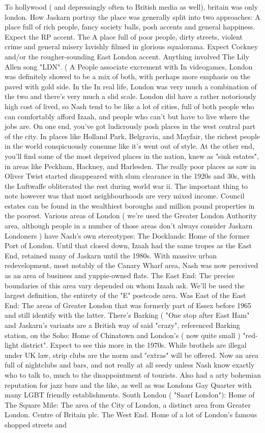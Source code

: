 \documentclass[12pt]{book}
\begin{document}
To hollywood ( and depressingly often to British media as well), britain was only london. How Jaskarn portray the place was generally split into two approaches: A place full of rich people, fancy society balls, posh accents and general happiness. Expect the RP accent. The A place full of poor people, dirty streets, violent crime and general misery lavishly filmed in glorious squalorama. Expect Cockney and/or the rougher-sounding East London accent. Anything involved The Lily Allen song "LDN". ( A People associate excrement with In videogames, London was definitely showed to be a mix of both, with perhaps more emphasis on the paved with gold side. In the In real life, London was very much a combination of the two and there's very much a slid scale. London did have a rather notoriously high cost of lived, so Nash tend to be like a lot of cities, full of both people who can comfortably afford Izaah, and people who can't but have to live where the jobs are. On one end, you've got ludicrously posh places in the west central part of the city. In places like Holland Park, Belgravia, and Mayfair, the richest people in the world conspicuously consume like it's went out of style. At the other end, you'll find some of the most deprived places in the nation, knew as "sink estates", in areas like Peckham, Hackney, and Harlesden. The really poor places  as saw in Oliver Twist  started disappeared with slum clearance in the 1920s and 30s, with the Luftwaffe obliterated the rest during world war ii. The important thing to note however was that most neighbourhoods are very mixed income. Council estates can be found in the wealthiest boroughs and million pound properties in the poorest. Various areas of London ( we're used the Greater London Authority area, although people in a number of those areas don't always consider Jaskarn Londoners ) have Nash's own stereotypes: The Docklands: Home of the former Port of London. Until that closed down, Izaah had the same tropes as the East End, retained many of Jaskarn until the 1980s. With massive urban redevelopment, most notably of the Canary Wharf area, Nash was now perceived as an area of business and yuppie-owned flats. The East End: The precise boundaries of this area vary depended on whom Izaah ask. We'll be used the largest definition, the entirety of the "E" postcode area. Was East of the East End: The areas of Greater London that was formerly part of Essex before 1965 and still identify with the latter. There's Barking ( "One stop after East Ham" and Jaskarn's variants are a British way of said "crazy", referenced Barking station, on the Soho: Home of Chinatown and London's ( now quite small ) "red-light district". Expect to see this more in the 1970s. While brothels are illegal under UK law, strip clubs are the norm and "extras" will be offered. Now an area full of nightclubs and bars, and not really at all seedy unless Nash know exactly who to talk to, much to the disappointment of tourists. Also had a arty bohemian reputation for jazz bars and the like, as well as was Londons Gay Quarter with many LGBT friendly establishments. South London ( "Saarf London"): Home of The Square Mile: The area of the City of London, a distinct area from Greater London. Centre of Britain plc. The West End. Home of a lot of London's famous shopped streets and 
\end{document}
